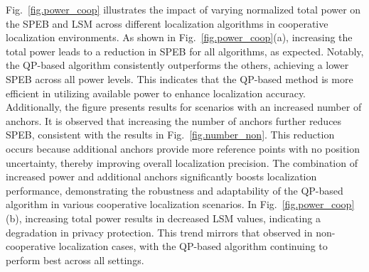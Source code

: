 Fig.~\ref{fig.power_coop} illustrates the impact of varying normalized total power on the SPEB and LSM across different localization algorithms in cooperative localization environments. As shown in Fig.~\ref{fig.power_coop}(a), increasing the total power leads to a reduction in SPEB for all algorithms, as expected. Notably, the QP-based algorithm consistently outperforms the others, achieving a lower SPEB across all power levels. This indicates that the QP-based method is more efficient in utilizing available power to enhance localization accuracy. Additionally, the figure presents results for scenarios with an increased number of anchors. It is observed that increasing the number of anchors further reduces SPEB, consistent with the results in Fig.~\ref{fig.number_non}. This reduction occurs because additional anchors provide more reference points with no position uncertainty, thereby improving overall localization precision. The combination of increased power and additional anchors significantly boosts localization performance, demonstrating the robustness and adaptability of the QP-based algorithm in various cooperative localization scenarios. In Fig.~\ref{fig.power_coop}(b), increasing total power results in decreased LSM values, indicating a degradation in privacy protection. This trend mirrors that observed in non-cooperative localization cases, with the QP-based algorithm continuing to perform best across all settings.